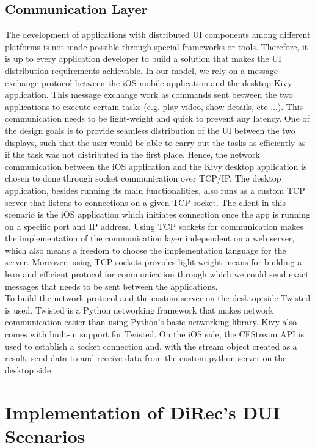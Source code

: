 \subsection{Communication Layer}
The development of applications with distributed UI components among different
platforms is not made possible through special frameworks or tools. Therefore,
it is up to every application developer to build a solution that makes the
UI distribution requirements achievable. In our model, we rely on a
message-exchange protocol between the iOS mobile application and the desktop
Kivy application. This message exchange work as commands sent between the two
applications to execute certain tasks (e.g. play video, show details, etc ...). This communication needs to be light-weight and quick to prevent any latency. One of the design goals is to provide seamless distribution of the UI between the two displays, such that the user would be able to carry out the tasks as efficiently as if the task was not distributed in the first place. Hence, the network communication between the iOS application and the Kivy desktop application is chosen to done through socket communication over TCP/IP. The desktop application, besides running its main functionalities, also runs as a custom TCP server that listens to connections on a given TCP socket. The client in this scenario is the iOS application which initiates connection once the app is running on a specific port and IP address. Using TCP sockets for communication makes the implementation of the communication layer independent on a web server, which also means a freedom to choose the implementation language for the server. Moreover, using TCP sockets provides light-weight means for building a lean and efficient protocol for communication through which we could send exact messages that needs to be sent between the applications.\\
To build the network protocol and the custom server on the desktop side Twisted
is used. Twisted is a Python networking framework that makes network
communication easier than using Python's basic networking library. Kivy also
comes with built-in support for Twisted. On the iOS side, the CFStream API is
used to establish a socket connection and, with the stream object created as a result, send data to and receive data from the custom python server on the desktop side.

\section{Implementation of DiRec's DUI Scenarios}

